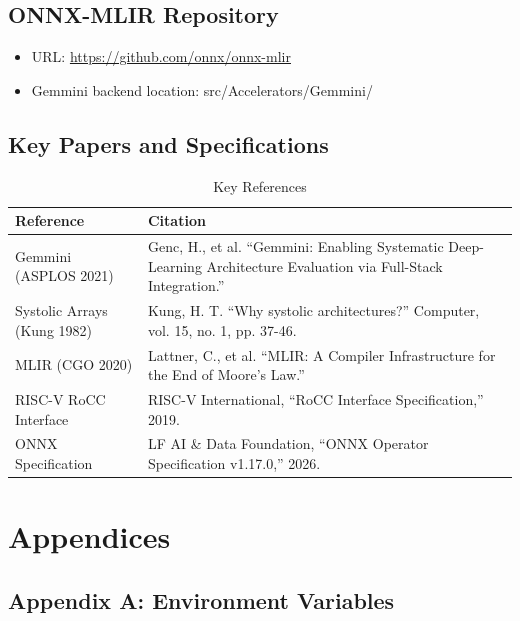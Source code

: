 \documentclass[12pt,a4paper]{article}
\begin{document}
\subsection{ONNX-MLIR Repository}

\begin{itemize}[leftmargin=*]
    \item URL: \url{https://github.com/onnx/onnx-mlir}
    \item Gemmini backend location: src/Accelerators/Gemmini/
\end{itemize}

\subsection{Key Papers and Specifications}

\begin{table}[H]
\centering
\begin{tabular}{|p{}|p{}|}
\hline
\textbf{Reference} & \textbf{Citation} \\
\hline
Gemmini (ASPLOS 2021) & Genc, H., et al. ``Gemmini: Enabling Systematic Deep-Learning Architecture Evaluation via Full-Stack Integration.'' \\
\hline
Systolic Arrays (Kung 1982) & Kung, H. T. ``Why systolic architectures?'' Computer, vol. 15, no. 1, pp. 37-46. \\
\hline
MLIR (CGO 2020) & Lattner, C., et al. ``MLIR: A Compiler Infrastructure for the End of Moore's Law.'' \\
\hline
RISC-V RoCC Interface & RISC-V International, ``RoCC Interface Specification,'' 2019. \\
\hline
ONNX Specification & LF AI \& Data Foundation, ``ONNX Operator Specification v1.17.0,'' 2026. \\
\hline
\end{tabular}
\caption{Key References}
\end{table}

\section{Appendices}

\subsection{Appendix A: Environment Variables}
\end{document}
